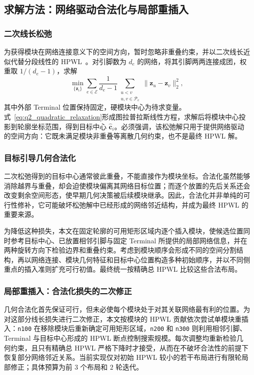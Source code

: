 \subsection{求解方法：网络驱动合法化与局部重插入}

\subsubsection{二次线长松弛}

为获得模块在网络连接意义下的空间方向，暂时忽略非重叠约束，并以二次线长近似代替分段线性的 HPWL~\cite{eisenmann1998}。对引脚数为 $d_e$ 的网络，将其引脚两两连接成团，权重取 $1/(d_e-1)$，求解
\begin{equation}
  \min_{\{\boldsymbol{z}_i\}}
  \sum_{e\in\mathcal{E}}\frac{1}{d_e-1}
  \sum_{\substack{u<v\\u,v\in\mathcal{P}_e}}
  \lVert\boldsymbol{z}_u-\boldsymbol{z}_v\rVert_2^2,
  \label{eq:q2_quadratic_relaxation}
\end{equation}
其中外部 Terminal 位置保持固定，硬模块中心为待求变量。式~\eqref{eq:q2_quadratic_relaxation}形成图拉普拉斯线性方程，求解后将模块中心投影到轮廓坐标范围，得到目标中心 $\widehat{\boldsymbol{c}}_i$。必须强调，该松弛解只用于提供网络驱动的空间方向：它既未满足模块非重叠等离散几何约束，也不是最终 HPWL 解。

\subsubsection{目标引导几何合法化}

二次松弛得到的目标中心通常彼此重叠，不能直接作为模块坐标。合法化虽然能够消除越界与重叠，却会迫使模块偏离其网络目标位置；而逐个放置的先后关系还会改变剩余空间形态，使早期几何决策被后续模块继承。因此，合法化并非单纯的可行性修补，它可能破坏松弛解中已经形成的网络邻近结构，并成为最终 HPWL 的重要来源。

为降低这种损失，本文在固定轮廓的可用矩形区域内逐个插入模块，使候选位置同时参考目标中心、已放置相邻引脚与固定 Terminal 所提供的局部网络信息，并在两种旋转方向下检验边界和重叠约束。考虑到模块顺序会形成不同的空间分割结构，再以网络连接、模块几何特征和目标中心位置构造多种初始顺序，并以不同侧重点的插入准则扩充可行初值。最终统一按精确总 HPWL 比较这些合法布局。

\subsubsection{局部重插入：合法化损失的二次修正}

几何合法化首先保证可行，但未必使每个模块处于对其关联网络最有利的位置。为对这部分线长损失进行二次修正，本文按模块的 HPWL 贡献依次尝试单模块重插入：\texttt{n100} 在移除模块后重新确定可用矩形区域，\texttt{n200} 和 \texttt{n300} 则利用相邻引脚、Terminal 与目标中心形成的 HPWL 断点控制搜索规模。每次调整均重新检验几何约束，且只有精确总 HPWL 严格下降时才接受，从而在不破坏合法性的前提下恢复部分网络邻近关系。当前实现仅对初始 HPWL 较小的若干布局进行有限轮局部修正；具体预算为前 $3$ 个布局和 $2$ 轮迭代。

